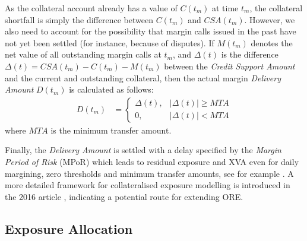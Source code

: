 \documentclass[12pt, a4paper]{article}
\begin{document}
\begin{appendix}
As the collateral account already has a value of $C(t_m)$ at time $t_m$, the collateral shortfall is simply the
difference between $C(t_m)$ and $CSA(t_m)$. However, we also need to account for the possibility that margin calls
issued in the past have not yet been settled (for instance, because of disputes). If $M(t_m)$ denotes the net value of
all outstanding margin calls at $t_m$, and $\Delta(t)$ is the difference $\Delta(t) = CSA(t_m) - C(t_m) - M(t_m)$
between the {\em Credit Support Amount} and the current and outstanding collateral, then the actual margin
\emph{Delivery Amount} $D(t_m)$ is calculated as follows:
\begin{align}\label{eq:DA}
D(t_m) &= 
\begin{cases}
\Delta(t),& \left| \Delta(t) \right| \ge MTA \\
0,& \left| \Delta(t) \right| < MTA
\end{cases}
\end{align}
where $MTA$ is the minimum transfer amount.

\medskip Finally, the {\em Delivery Amount } is settled with a delay specified by the {\em Margin Period of Risk}
(MPoR) which leads to residual exposure and XVA even for daily margining, zero thresholds and minimum transfer amounts,
see for example \cite{Pykhtin2010}. A more detailed framework for collateralised exposure modelling is introduced in the
2016 article \cite{Andersen2016}, indicating a potential route for extending ORE.

\subsection{Exposure Allocation}\label{sec:app_allocation}


\end{appendix}
\end{document}
